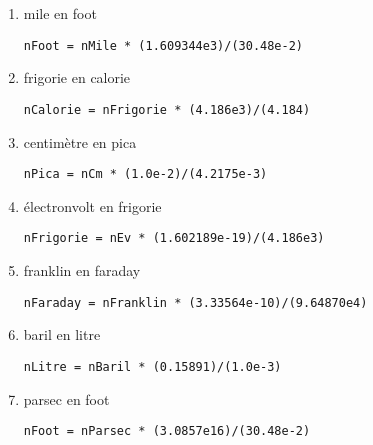 \documentclass[11pt,a4paper]{article}
\begin{document}
\begin{enumerate}
\item mile en foot\hfill
\begin{minipage}[t]{9.5cm}
\begin{Verbatim}
nFoot = nMile * (1.609344e3)/(30.48e-2)
\end{Verbatim}
\end{minipage}

\item frigorie en calorie\hfill
\begin{minipage}[t]{9.5cm}
\begin{Verbatim}
nCalorie = nFrigorie * (4.186e3)/(4.184)
\end{Verbatim}
\end{minipage}

\item centimètre en pica\hfill
\begin{minipage}[t]{9.5cm}
\begin{Verbatim}
nPica = nCm * (1.0e-2)/(4.2175e-3)
\end{Verbatim}
\end{minipage}

\item électronvolt en frigorie\hfill
\begin{minipage}[t]{9.5cm}
\begin{Verbatim}
nFrigorie = nEv * (1.602189e-19)/(4.186e3)
\end{Verbatim}
\end{minipage}

\item franklin en faraday\hfill
\begin{minipage}[t]{9.5cm}
\begin{Verbatim}
nFaraday = nFranklin * (3.33564e-10)/(9.64870e4)
\end{Verbatim}
\end{minipage}

\item baril en litre\hfill
\begin{minipage}[t]{9.5cm}
\begin{Verbatim}
nLitre = nBaril * (0.15891)/(1.0e-3)
\end{Verbatim}
\end{minipage}

\item parsec en foot\hfill
\begin{minipage}[t]{9.5cm}
\begin{Verbatim}
nFoot = nParsec * (3.0857e16)/(30.48e-2)
\end{Verbatim}
\end{minipage}



\end{enumerate}
\end{document}
